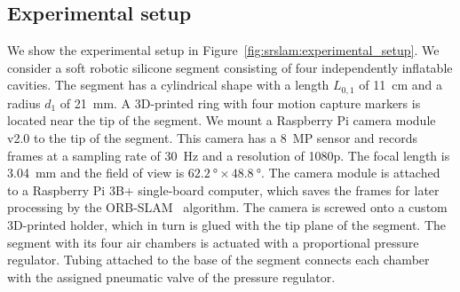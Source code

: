 \subsection{Experimental setup}
We show the experimental setup in Figure~\ref{fig:srslam:experimental_setup}.
We consider a soft robotic silicone segment consisting of four independently inflatable cavities. The segment has a cylindrical shape with a length $L_{0,1}$ of \SI{11}{cm} and a radius $d_1$ of \SI{21}{mm}. 
A 3D-printed ring with four motion capture markers is located near the tip of the segment.
%
We mount a Raspberry Pi camera module v2.0 to the tip of the segment.
This camera has a \SI{8}{MP} sensor and records frames at a sampling rate of \SI{30}{Hz} and a resolution of 1080p.
The focal length is \SI{3.04}{mm} and the field of view is $\SI{62.2}{\degree} \times \SI{48.8}{\degree}$.
The camera module is attached to a Raspberry Pi 3B+ single-board computer, which saves the frames for later processing by the ORB-SLAM~\citep{mur2017orb} algorithm.
The camera is screwed onto a custom 3D-printed holder, which in turn is glued with the tip plane of the segment.
%
The segment with its four air chambers is actuated with a proportional pressure regulator.
Tubing attached to the base of the segment connects each chamber with the assigned pneumatic valve of the pressure regulator.
%

